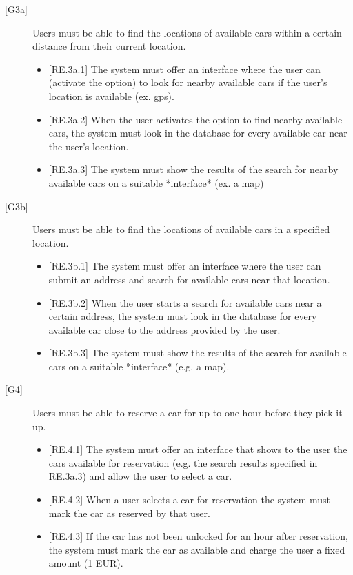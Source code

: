 \documentclass[english]{article}
\begin{document}
\begin{description}
\item[{[G3a]}]{Users must be able to find the locations of available cars within a certain distance from their current location.
\begin{itemize}
	\item{[RE.3a.1] The system must offer an interface where the user can (activate the option) to look for nearby available cars if the user’s location is available (ex. gps).}
	\item{[RE.3a.2] When the user activates the option to find nearby available cars, the system must look in the database for every available car near the user’s location.}
	\item{[RE.3a.3] The system must show the results of the search for nearby available cars on a suitable *interface* (ex. a map)}
\end{itemize}
}

\item[{[G3b]}]{Users must be able to find the locations of available cars in a specified location.
\begin{itemize}
	\item{[RE.3b.1] The system must offer an interface where the user can submit an address and search for available cars near that location.}
	\item{[RE.3b.2] When the user starts a search for available cars near a certain address, the system must look in the database for every available car close to the address provided by the user.}
	\item{[RE.3b.3] The system must show the results of the search for available cars on a suitable *interface* (e.g. a map).}
\end{itemize}
}

\item[{[G4]}]{Users must be able to reserve a car for up to one hour before they pick it up.
\begin{itemize}
	\item{[RE.4.1] The system must offer an interface that shows to the user the cars available for reservation (e.g. the search results specified in RE.3a.3) and allow the user to select a car.}
	\item{[RE.4.2] When a user selects a car for reservation the system must mark the car as reserved by that user.}
	\item{[RE.4.3] If the car has not been unlocked for an hour after reservation, the system must mark the car as available and charge the user a fixed amount (1 EUR).}
	

\end{itemize}}
\end{description}
\end{document}
